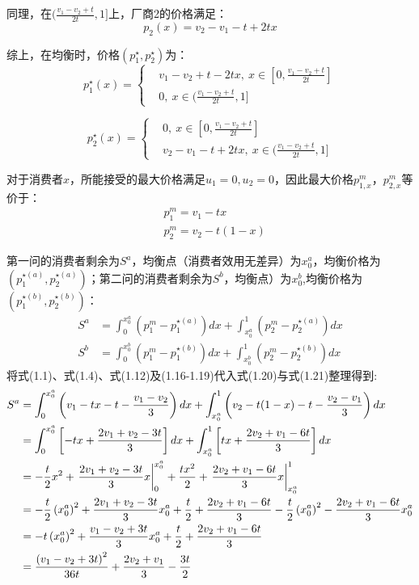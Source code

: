 同理，在$(\frac{v_1-v_2+t}{2t},1]$上，厂商2的价格满足：
\begin{equation}
    p_2(x) =  v_2-v_1-t+2tx 
\end{equation}

综上，在均衡时，价格$(p_1^{\star},p_2^{\star})$为：
\begin{equation}
p_1^{\star}(x)=
    \begin{cases}
      &  v_1-v_2+t-2tx,  \ x \in [0,\frac{v_1-v_2+t}{2t}] \\
     &0 ,\  x \in ( \frac{v_1-v_2+t}{2t},1]
    \end{cases}
\end{equation}

\begin{equation}
p_2^{\star}(x)= 
    \begin{cases}
     & 0,  \ x \in [0,\frac{v_1-v_2+t}{2t}] \\
     & v_2-v_1-t+2tx ,\  x \in ( \frac{v_1-v_2+t}{2t},1]
    \end{cases}
\end{equation}

\qpart
对于消费者$x$，所能接受的最大价格满足$u_1=0, u_2=0  $，因此最大价格$p^m_{1,x}$，$p^m_{2,x}$等价于：
\begin{align}
&p_1^m=v_1-t x \\
&p_2^m=v_2-t(1-x)
\end{align}

第一问的消费者剩余为$S^a$，均衡点（消费者效用无差异）为$x_0^a$，均衡价格为$(p_1^{\star(a)},p_2^{\star(a)})$；第二问的消费者剩余为$S^b$，均衡点）为$x_0^b$,均衡价格为$(p_1^{\star(b)},p_2^{\star(b)})$：
\begin{align}
    S^a &= \int_0^{x_0^a}(p_1^m-p_1^{\star(a)})dx+\int_{x_0^a}^{1}(p_2^m-p_2^{\star(a)})dx \\
    S^b &= \int_0^{x_0^b}(p_1^m-p_1^{\star(b)})dx+\int_{x_0^b}^{1}(p_2^m-p_2^{\star(b)})dx 
\end{align}
将式(1.1)、式(1.4)、式(1.12)及(1.16-1.19)代入式(1.20)与式(1.21)整理得到:
\begin{align}
S^a&=\int_0^{x_0^a}\left(v_1-t x-t-\frac{v_1-v_2}{3}\right) d x+\int_{x_0^a}^1\left(v_2-t(1-x)-t-\frac{v_2-v_1}{3}\right) d x \notag \\
&=\int_0^{x_0^a}\left[-t x+\frac{2 v_1+v_2-3 t}{3}\right] d x+\int_{x_0^a}^1\left[t x+\frac{2 v_2+v_1-6 t}{3}\right] d x \notag \\
&=-\frac{t}{2} x^2+\left.\frac{2 v_1+v_2-3 t}{3} x\right|_0 ^{x_0^a}+\frac{t x^2}{2}+\left.\frac{2 v_2+v_1-6 t}{3} x\right|_{x_0^a}^1 \notag \\
&=-\frac{t}{2}\left(x_0^a\right)^2+\frac{2 v_1+v_2-3 t}{3} x_0^a+\frac{t}{2}+\frac{2 v_2+v_1-6 t}{3}-\frac{t}{2}\left(x_0^a\right)^2-\frac{2 v_2+v_1-6t}{3} x_0^a \notag \\
&=-t\left(x_0^a\right)^2+\frac{v_1-v_2+3 t}{3} x_0^a+\frac{t}{2}+\frac{2 v_2+v_1-6 t}{3} \notag \\
&=\frac{\left(v_1-v_2+3 t\right)^2}{36 t}+\frac{2 v_2+v_1}{3}-\frac{3t}{2}
\end{align}

